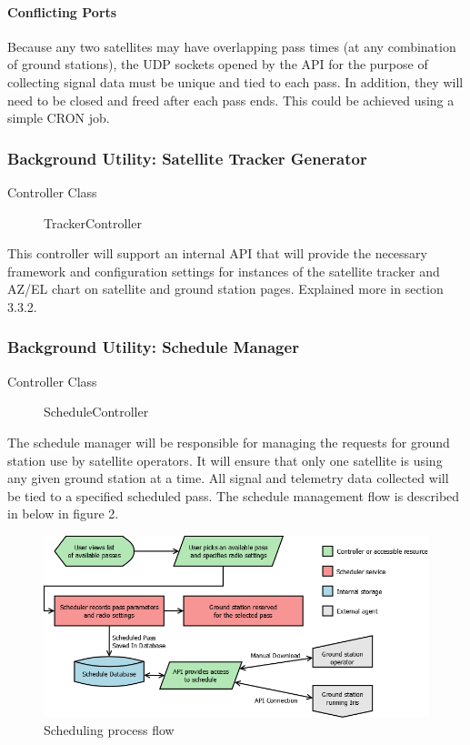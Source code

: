 \documentclass{mxl-note}
\begin{document}
\paragraph{Conflicting Ports}
Because any two satellites may have overlapping pass times (at any combination of ground stations), the UDP sockets opened by the API for the purpose of collecting signal data must be unique and tied to each pass. In addition, they will need to be closed and freed after each pass ends. This could be achieved using a simple CRON job.

\subsubsection{Background Utility: Satellite Tracker Generator}
\begin{description}
	\item [Controller Class]TrackerController
\end{description}
This controller will support an internal API that will provide the necessary framework and configuration settings for instances of the satellite tracker and AZ/EL chart on satellite and ground station pages. Explained more in section 3.3.2.

\subsubsection{Background Utility: Schedule Manager}
\begin{description}
	\item [Controller Class]ScheduleController
\end{description}
The schedule manager will be responsible for managing the requests for ground station use by satellite operators. It will ensure that only one satellite is using any given ground station at a time. All signal and telemetry data collected will be tied to a specified scheduled pass. The schedule management flow is described in below in figure 2.
\begin{figure}[hbtp]
\centering
\includegraphics[scale=.4]{SchedulingFlow.png}
\caption{Scheduling process flow}
\end{figure}
\end{document}
